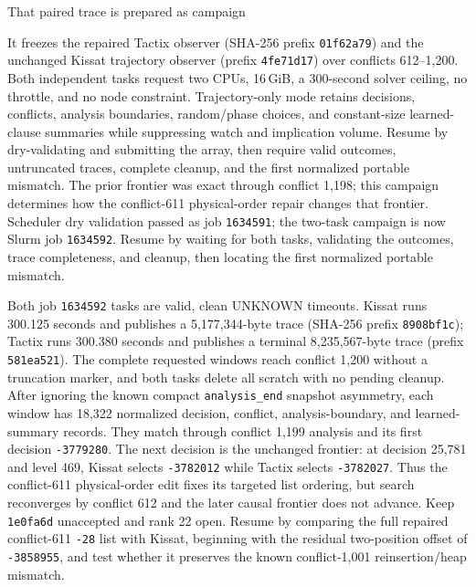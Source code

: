 \documentclass[11pt]{article}
\newcommand{\code}[1]{\texttt{#1}}
\newcommand{\artifact}[1]{\path{#1}}
\begin{document}
That paired trace is prepared as campaign
\begin{center}\small\artifact{20260819-1056-tierd-rank22-post611-trajectory}\end{center}
It freezes the repaired Tactix observer (SHA-256 prefix \code{01f62a79}) and
the unchanged Kissat trajectory observer (prefix \code{4fe71d17}) over
conflicts 612--1,200. Both independent tasks request two CPUs, 16\,GiB, a
300-second solver ceiling, no throttle, and no node constraint. Trajectory-only
mode retains decisions, conflicts, analysis boundaries, random/phase choices,
and constant-size learned-clause summaries while suppressing watch and
implication volume. Resume by dry-validating and submitting the array, then
require valid outcomes, untruncated traces, complete cleanup, and the first
normalized portable mismatch. The prior frontier was exact through conflict
1,198; this campaign determines how the conflict-611 physical-order repair
changes that frontier.
Scheduler dry validation passed as job \code{1634591}; the two-task campaign
is now Slurm job \code{1634592}. Resume by waiting for both tasks, validating
the outcomes, trace completeness, and cleanup, then locating the first
normalized portable mismatch.

Both job \code{1634592} tasks are valid, clean UNKNOWN timeouts. Kissat runs
300.125 seconds and publishes a 5,177,344-byte trace (SHA-256 prefix
\code{8908bf1c}); Tactix runs 300.380 seconds and publishes a terminal
8,235,567-byte trace (prefix \code{581ea521}). The complete requested windows
reach conflict 1,200 without a truncation marker, and both tasks delete all
scratch with no pending cleanup. After ignoring the known compact
\code{analysis\_end} snapshot asymmetry, each window has 18,322 normalized
decision, conflict, analysis-boundary, and learned-summary records. They match
through conflict 1,199 analysis and its first decision \code{-3779280}. The
next decision is the unchanged frontier: at decision 25,781 and level 469,
Kissat selects \code{-3782012} while Tactix selects \code{-3782027}. Thus the
conflict-611 physical-order edit fixes its targeted list ordering, but search
reconverges by conflict 612 and the later causal frontier does not advance.
Keep \code{1e0fa6d} unaccepted and rank 22 open. Resume by comparing the full
repaired conflict-611 \code{-28} list with Kissat, beginning with the residual
two-position offset of \code{-3858955}, and test whether it preserves the
known conflict-1,001 reinsertion/heap mismatch.
\end{document}
